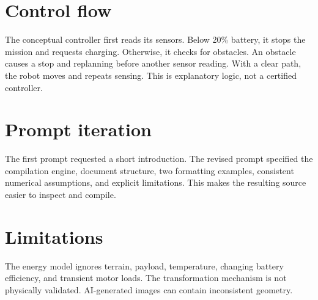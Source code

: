 \documentclass[11pt,a4paper]{article}
\begin{document}
\section{Control flow}
The conceptual controller first reads its sensors. Below 20\% battery, it stops the mission and requests charging. Otherwise, it checks for obstacles. An obstacle causes a stop and replanning before another sensor reading. With a clear path, the robot moves and repeats sensing. This is explanatory logic, not a certified controller.
\section{Prompt iteration}
The first prompt requested a short introduction. The revised prompt specified the compilation engine, document structure, two formatting examples, consistent numerical assumptions, and explicit limitations. This makes the resulting source easier to inspect and compile.
\section{Limitations}
The energy model ignores terrain, payload, temperature, changing battery efficiency, and transient motor loads. The transformation mechanism is not physically validated. AI-generated images can contain inconsistent geometry.
\end{document}
